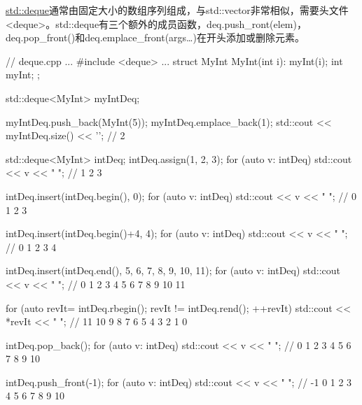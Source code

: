 

\href{http://en.cppreference.com/w/cpp/container/deque}{std::deque}通常由固定大小的数组序列组成，与std::vector非常相似，需要头文件<deque>。std::deque有三个额外的成员函数，deq.push\_ront(elem)，deq.pop\_front()和deq.emplace\_front(args…)在开头添加或删除元素。


\begin{cpp}
// deque.cpp
...
#include <deque>
...
struct MyInt{
	MyInt(int i): myInt(i){};
	int myInt;
};

std::deque<MyInt> myIntDeq;

myIntDeq.push_back(MyInt(5));
myIntDeq.emplace_back(1);
std::cout << myIntDeq.size() << '\n'; // 2

std::deque<MyInt> intDeq;
intDeq.assign({1, 2, 3});
for (auto v: intDeq) std::cout << v << " "; // 1 2 3

intDeq.insert(intDeq.begin(), 0);
for (auto v: intDeq) std::cout << v << " "; // 0 1 2 3

intDeq.insert(intDeq.begin()+4, 4);
for (auto v: intDeq) std::cout << v << " "; // 0 1 2 3 4

intDeq.insert(intDeq.end(), {5, 6, 7, 8, 9, 10, 11});
for (auto v: intDeq) std::cout << v << " "; // 0 1 2 3 4 5 6 7 8 9 10 11

for (auto revIt= intDeq.rbegin(); revIt != intDeq.rend(); ++revIt)
	std::cout << *revIt << " "; // 11 10 9 8 7 6 5 4 3 2 1 0

intDeq.pop_back();
for (auto v: intDeq) std::cout << v << " "; // 0 1 2 3 4 5 6 7 8 9 10

intDeq.push_front(-1);
for (auto v: intDeq) std::cout << v << " "; // -1 0 1 2 3 4 5 6 7 8 9 10
\end{cpp}











































